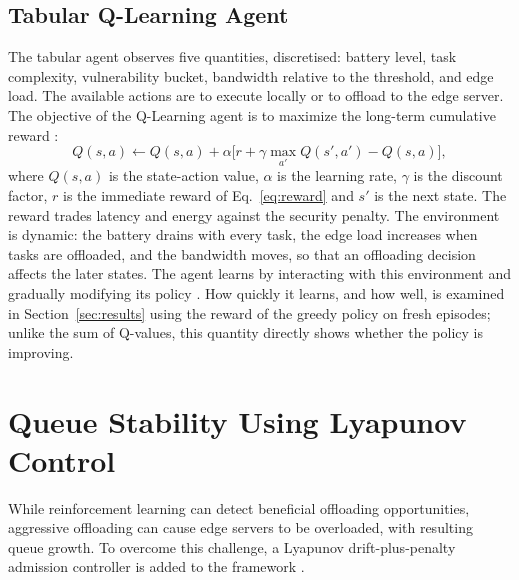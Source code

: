 \documentclass{ieeeaccess}
\begin{document}
\subsection{Tabular Q-Learning Agent}
The tabular agent observes five quantities, discretised: battery level, task complexity, vulnerability bucket, bandwidth relative to the threshold, and edge load. The available actions are to execute locally or to offload to the edge server. The objective of the Q-Learning agent is to maximize the long-term cumulative reward \cite{kiran2020}:
\begin{equation}
Q(s,a) \leftarrow Q(s,a) + \alpha\bigl[r + \gamma \max_{a'} Q(s',a') - Q(s,a)\bigr],
\label{eq:qupdate}
\end{equation}
where $Q(s,a)$ is the state-action value, $\alpha$ is the learning rate, $\gamma$ is the discount factor, $r$ is the immediate reward of Eq.~\eqref{eq:reward} and $s'$ is the next state. The reward trades latency and energy against the security penalty. The environment is dynamic: the battery drains with every task, the edge load increases when tasks are offloaded, and the bandwidth moves, so that an offloading decision affects the later states. The agent learns by interacting with this environment and gradually modifying its policy \cite{tang2022,huang2019}. How quickly it learns, and how well, is examined in Section~\ref{sec:results} using the reward of the greedy policy on fresh episodes; unlike the sum of Q-values, this quantity directly shows whether the policy is improving.

\section{Queue Stability Using Lyapunov Control}
\label{sec:queue}
While reinforcement learning can detect beneficial offloading opportunities, aggressive offloading can cause edge servers to be overloaded, with resulting queue growth. To overcome this challenge, a Lyapunov drift-plus-penalty admission controller is added to the framework \cite{bi2021,bae2020}.
\end{document}
